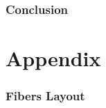 \documentclass[USenglish]{latex/atlasdoc}
\begin{document}
\section{Conclusion}
\label{sec:conclusion}



%

\clearpage
\appendix
\part*{Appendix}

\section{Fibers Layout}
\label{app:specs-fibers}

\FloatBarrier

%

% 

% 


% 
\end{document}
